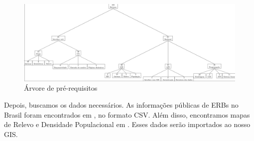 \documentclass[12pt,a4paper]{article}
\begin{document}
\begin{figure}[htp]
    \centering
    \includegraphics[width=1.4\textwidth, angle=270]{../misc/arvore_prerequisitos.pdf}
	\caption{Árvore de pré-requisitos}
	\label{fig:prerequisitos}
\end{figure}

Depois, buscamos os dados necessários. As informações públicas de ERBs no Brasil
foram encontrados em \cite{mapa-erb}, no formato CSV. Além disso, encontramos
mapas de Relevo e Densidade Populacional em \cite{mapa-ibge}. Esses dados serão
importados ao nosso GIS.
\end{document}

